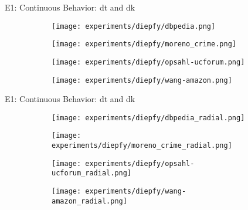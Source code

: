 \begin{frame}[fragile]{E1: Continuous Behavior: \acrshort{dt} and \acrshort{dk}}
  \begin{figure}[!htp]
    \centering
    \begin{subfigure}[t]{0.45\textwidth}
     \texttt{[image: experiments/diepfy/dbpedia.png]}
    \end{subfigure}\hfill
    \begin{subfigure}[t]{0.45\textwidth}
     \texttt{[image: experiments/diepfy/moreno\_crime.png]}
    \end{subfigure}
    \vspace{0.5cm}
  
    \begin{subfigure}[t]{0.45\textwidth}
     \texttt{[image: experiments/diepfy/opsahl-ucforum.png]}
    \end{subfigure}\hfill
    \begin{subfigure}[t]{0.45\textwidth}
      \texttt{[image: experiments/diepfy/wang-amazon.png]}
     \end{subfigure}
   \end{figure}
  \end{frame}

  \begin{frame}[fragile]{E1: Continuous Behavior: \acrshort{dt} and \acrshort{dk}}
    \begin{figure}[!htp]
      \centering
      \begin{subfigure}[t]{0.45\textwidth}
      \texttt{[image: experiments/diepfy/dbpedia\_radial.png]}
      \end{subfigure}\hfill
      \begin{subfigure}[t]{0.45\textwidth}
      \texttt{[image: experiments/diepfy/moreno\_crime\_radial.png]}
      \end{subfigure}
      \vspace{0.5cm}
      \begin{subfigure}[t]{0.45\textwidth}
      \texttt{[image: experiments/diepfy/opsahl-ucforum\_radial.png]}
      \end{subfigure}\hfill
      \begin{subfigure}[t]{0.45\textwidth}
        \texttt{[image: experiments/diepfy/wang-amazon\_radial.png]}
      \end{subfigure}
    \end{figure}
    \end{frame}


